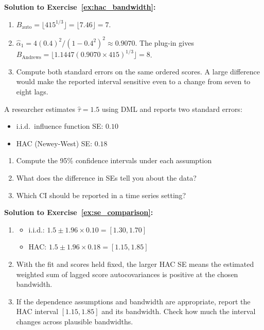 \textbf{Solution to Exercise~\ref{ex:hac_bandwidth}:}

\begin{enumerate}
    \item[(a)] $B_{\mathrm{auto}}=\lfloor 415^{1/3}\rfloor=\lfloor 7.46\rfloor=7$.

    \item[(b)] $\hat\alpha_1=4(0.4)^2/(1-0.4^2)^2\approx 0.9070$. The plug-in gives $B_{\mathrm{Andrews}}=\lfloor 1.1447(0.9070\times415)^{1/3}\rfloor=8$.

    \item[(c)] Compute both standard errors on the same ordered scores. A large difference would make the reported interval sensitive even to a change from seven to eight lags.
\end{enumerate}

\begin{exercise}
\label{ex:se_comparison}
A researcher estimates $\hat{\tau} = 1.5$ using DML and reports two standard errors:
\begin{itemize}
    \item i.i.d.\ influence function SE: $0.10$
    \item HAC (Newey-West) SE: $0.18$
\end{itemize}

\begin{enumerate}
    \item[(a)] Compute the 95\% confidence intervals under each assumption
    \item[(b)] What does the difference in SEs tell you about the data?
    \item[(c)] Which CI should be reported in a time series setting?
\end{enumerate}
\end{exercise}

\textbf{Solution to Exercise~\ref{ex:se_comparison}:}

\begin{enumerate}
    \item[(a)]
    \begin{itemize}
        \item i.i.d.: $1.5 \pm 1.96 \times 0.10 = [1.30, 1.70]$
        \item HAC: $1.5 \pm 1.96 \times 0.18 = [1.15, 1.85]$
    \end{itemize}

    \item[(b)] With the fit and scores held fixed, the larger HAC SE means the estimated weighted sum of lagged score autocovariances is positive at the chosen bandwidth.

    \item[(c)] If the dependence assumptions and bandwidth are appropriate, report the HAC interval $[1.15, 1.85]$ and its bandwidth. Check how much the interval changes across plausible bandwidths.
\end{enumerate}

